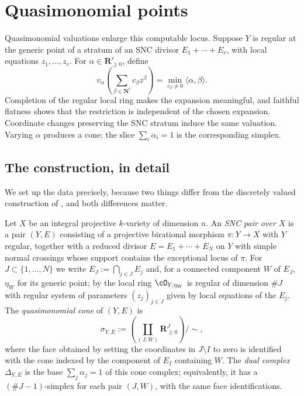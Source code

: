 \section{Quasimonomial points}
\label{sec:ch32-quasimonomial}

Quasimonomial valuations enlarge this computable locus.  Suppose $Y$ is
regular at the generic point of a stratum of an SNC divisor
$E_1+\cdots+E_r$, with local equations $z_1,\ldots,z_r$.  For
$\alpha\in\mathbf R_{\geq0}^r$, define
\begin{equation}
\label{eq:quasimonomial-valuation}
 v_\alpha\!\left(\sum_{\beta\in\mathbf N^r}c_\beta z^\beta\right)
 =\min_{c_\beta\ne0}\langle\alpha,\beta\rangle .
\end{equation}
Completion of the regular local ring makes the expansion meaningful, and
faithful flatness shows that the restriction is independent of the chosen
expansion.  Coordinate changes preserving the SNC stratum induce the same
valuation.  Varying $\alpha$ produces a cone; the slice
$\sum_i\alpha_i=1$ is the corresponding simplex.

\subsection{The construction, in detail}
\label{sec:ch32-qm-construction}

We set up the data precisely, because two things differ from the discretely
valued construction of , and both differences
matter.

\begin{definition}
\label{def:ch32-snc-pair}
Let $X$ be an integral projective $k$-variety of dimension $n$.  An
\emph{SNC pair over $X$} is a pair $(Y,E)$ consisting of a projective
birational morphism $\pi:Y\to X$ with $Y$ regular, together with a
reduced divisor $E=E_1+\cdots+E_N$ on $Y$ with simple normal crossings
whose support contains the exceptional locus of $\pi$.  For
$J\subset\{1,\ldots,N\}$ we write $E_J:=\bigcap_{j\in J}E_j$ and, for a
connected component $W$ of $E_J$, $\eta_W$ for its generic point; by
 the local ring $\cO_{Y,\eta_W}$ is regular of
dimension $\#J$ with regular system of parameters
$(z_j)_{j\in J}$ given by local equations of the $E_j$.  The
\emph{quasimonomial cone} of $(Y,E)$ is
\[
 \sigma_{Y,E}:=\left(\coprod_{(J,W)}\mathbf R_{\geq0}^{J}\right)\big/\!\sim,
\]
where the face obtained by setting the coordinates in $J\setminus I$ to
zero is identified with the cone indexed by the component of $E_I$
containing $W$.  The \emph{dual complex} $\Delta_{Y,E}$ is the base
$\sum_j\alpha_j=1$ of this cone complex; equivalently, it has a
$(\#J-1)$-simplex for each pair $(J,W)$, with the same face identifications.
\end{definition}

